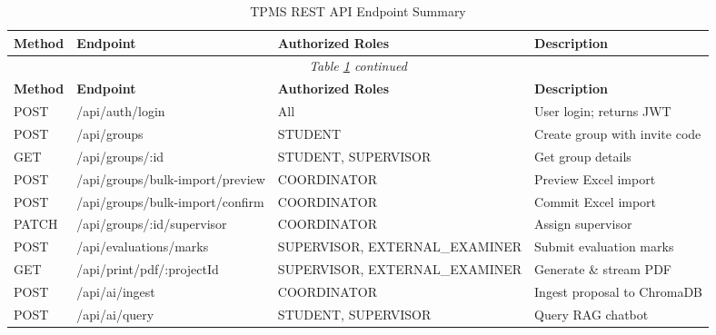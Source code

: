 \documentclass[12pt]{report}
\begin{document}
\begin{longtable}{p{1cm} p{4.5cm} p{3.5cm} p{3.5cm}}
\caption{TPMS REST API Endpoint Summary}\label{tab:api_endpoints}\\
\toprule
\textbf{Method} & \textbf{Endpoint} & \textbf{Authorized Roles} & \textbf{Description}\\
\midrule
\endfirsthead
\multicolumn{4}{c}{\textit{Table \ref{tab:api_endpoints} continued}}\\
\toprule \textbf{Method} & \textbf{Endpoint} & \textbf{Authorized Roles} & \textbf{Description}\\ \midrule
\endhead
\bottomrule \endlastfoot
POST   & /api/auth/login              & All                       & User login; returns JWT\\
POST   & /api/groups                  & STUDENT                   & Create group with invite code\\
GET    & /api/groups/:id              & STUDENT, SUPERVISOR       & Get group details\\
POST   & /api/groups/bulk-import/preview & COORDINATOR            & Preview Excel import\\
POST   & /api/groups/bulk-import/confirm & COORDINATOR            & Commit Excel import\\
PATCH  & /api/groups/:id/supervisor   & COORDINATOR               & Assign supervisor\\
POST   & /api/evaluations/marks       & SUPERVISOR, EXTERNAL\_EXAMINER & Submit evaluation marks\\
GET    & /api/print/pdf/:projectId    & SUPERVISOR, EXTERNAL\_EXAMINER & Generate \& stream PDF\\
POST   & /api/ai/ingest               & COORDINATOR               & Ingest proposal to ChromaDB\\
POST   & /api/ai/query                & STUDENT, SUPERVISOR       & Query RAG chatbot\\
\end{longtable}
\end{document}
